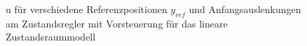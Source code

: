 \documentclass[
	pagesize,
	fontsize=12pt,
	paper=a4,
	oneside,
   reqno
]{scrartcl}
\begin{document}
\begin{figure}[H]
    \centering
    \caption[u für Regler mit Vorsteuerung (linear)]{u für verschiedene Referenzpositionen $y_{ref}$ und Anfangsauslenkungen am Zustandsregler mit Vorsteuerung für das lineare Zustandsraummodell}
    \label{fig:Bild17}
\end{figure}
\end{document}
